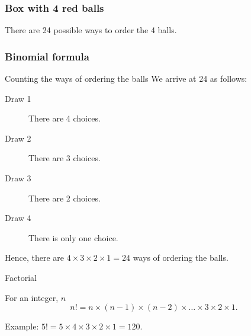 \documentclass[handout]{beamer}
\begin{document}
   \begin{frame}
   \frametitle{Box with 4 red balls}
   \begin{center}
   \end{center}
   There are 24 possible ways to order the 4 balls.
   \end{frame}


   \begin{frame} \frametitle{Binomial formula}

   \begin{block}
   {Counting the ways of ordering the balls}
   We arrive at 24 as follows:
   \begin{description}

   \item[Draw 1] There are 4 choices.

   \item[Draw 2] There are 3 choices.

   \item[Draw 3] There are 2 choices.

   \item[Draw 4] There is only one choice.
   \end{description}

   Hence, there are $4 \times 3 \times 2 \times 1 = 24$ ways
   of ordering the balls.
   \end{block}

   \begin{block}
   {Factorial}

   For an integer, $n$
   $$
   n! = n \times (n-1) \times (n-2) \times \dots \times 3 \times 2 \times 1.
   $$

   Example: $5! = 5 \times 4 \times 3 \times 2 \times 1 = 120$.
   \end{block}
   \end{frame}

\end{document}
